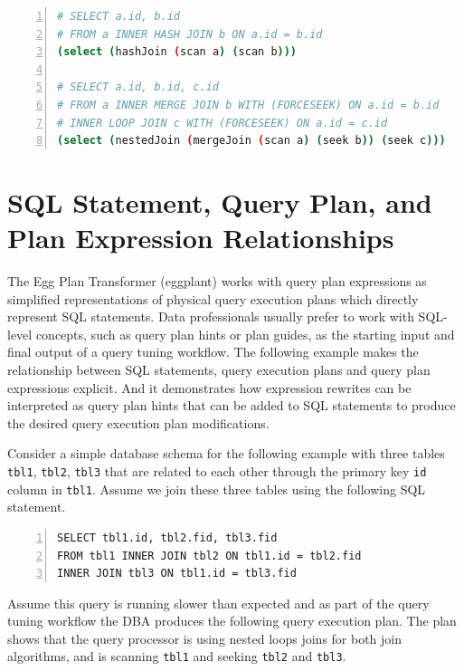\documentclass{article}
\begin{document}
\begin{lstlisting}[language=bash,
    frame=single, numbers=left, numbersep=5pt, numberstyle=\tiny\color{mygray},]
# SELECT a.id, b.id
# FROM a INNER HASH JOIN b ON a.id = b.id
(select (hashJoin (scan a) (scan b)))

# SELECT a.id, b.id, c.id 
# FROM a INNER MERGE JOIN b WITH (FORCESEEK) ON a.id = b.id
# INNER LOOP JOIN c WITH (FORCESEEK) ON a.id = c.id
(select (nestedJoin (mergeJoin (scan a) (seek b)) (seek c)))
\end{lstlisting}

\section*{SQL Statement, Query Plan, and Plan Expression Relationships}
The Egg Plan Transformer (eggplant) works with query plan expressions as simplified representations of 
physical query execution plans which directly represent SQL statements.  Data professionals usually
prefer to work with SQL-level concepts, such as query plan hints or plan guides, as the starting
input and final output of a query tuning workflow.  The following example makes the relationship
between SQL statements, query execution plans and query plan expressions explicit.  And it
demonstrates how expression rewrites can be interpreted as query plan hints that can be added to
SQL statements to produce the desired query execution plan modifications.  \cite{Korotkevitch:2014}

Consider a simple database schema for the following example with three tables \texttt{tbl1}, 
\texttt{tbl2}, \texttt{tbl3} that are related to each other through the primary key \texttt{id} column in \texttt{tbl1}.
Assume we join these three tables using the following SQL statement.

\begin{lstlisting}[language=bash,
    frame=single, numbers=left, numbersep=5pt, numberstyle=\tiny\color{mygray},]
SELECT tbl1.id, tbl2.fid, tbl3.fid
FROM tbl1 INNER JOIN tbl2 ON tbl1.id = tbl2.fid
INNER JOIN tbl3 ON tbl1.id = tbl3.fid
\end{lstlisting}

Assume this query is running slower than expected and as part of the query
tuning workflow the DBA produces the following query execution plan.  The plan shows that the query processor is using nested
loops joins for both join algorithms, and is scanning \texttt{tbl1} and seeking \texttt{tbl2} and \texttt{tbl3}.
\end{document}
